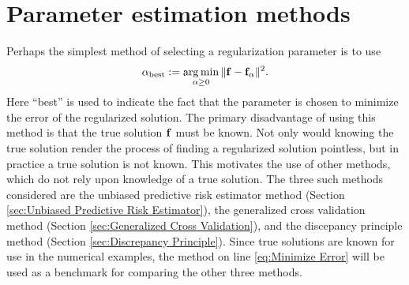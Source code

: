 \chapter{Parameter estimation methods} \label{ch:Parameter estimation methods}

Perhaps the simplest method of selecting a regularization parameter is to use
\begin{equation}
\alpha_{\text{best}} := \operatorname*{arg\,min}_{\alpha \geq 0} \|\mathbf{f} - \mathbf{f}_{\alpha}\|^2.
\label{eq:Minimize Error}
\end{equation}
Here ``best'' is used to indicate the fact that the parameter is chosen to minimize the error of the regularized solution. The primary disadvantage of using this method is that the true solution $\mathbf{f}$ must be known. Not only would knowing the true solution render the process of finding a regularized solution pointless, but in practice a true solution is not known. This motivates the use of other methods, which do not rely upon knowledge of a true solution. The three such methods considered are the unbiased predictive risk estimator method (Section \ref{sec:Unbiased Predictive Risk Estimator}), the generalized cross validation method (Section \ref{sec:Generalized Cross Validation}), and the discepancy principle method (Section \ref{sec:Discrepancy Principle}). Since true solutions are known for use in the numerical examples, the method on line \eqref{eq:Minimize Error} will be used as a benchmark for comparing the other three methods.

